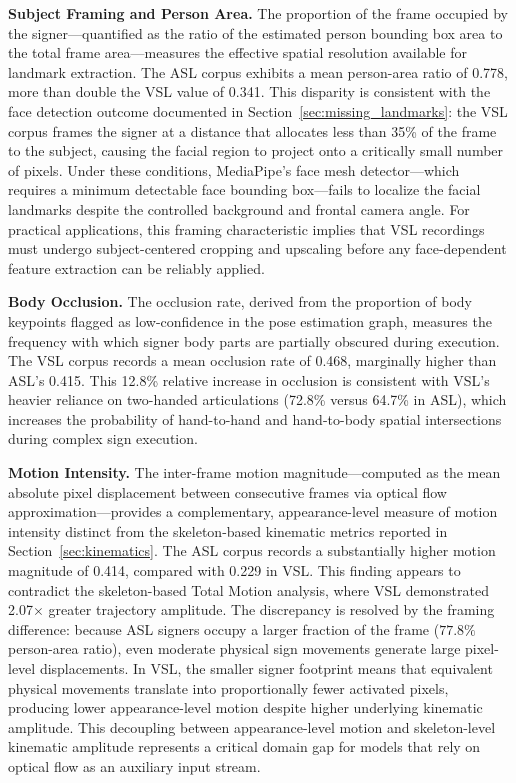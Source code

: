 \documentclass{ieeeaccess}
\DeclareRobustCommand{\textbf}[1]{{\bfseries #1}}
\begin{document}
\textbf{Subject Framing and Person Area.} The proportion of the frame occupied by the signer—quantified as the ratio of the estimated person bounding box area to the total frame area—measures the effective spatial resolution available for landmark extraction. The ASL corpus exhibits a mean person-area ratio of 0.778, more than double the VSL value of 0.341. This disparity is consistent with the face detection outcome documented in Section~\ref{sec:missing_landmarks}: the VSL corpus frames the signer at a distance that allocates less than 35\% of the frame to the subject, causing the facial region to project onto a critically small number of pixels. Under these conditions, MediaPipe's face mesh detector—which requires a minimum detectable face bounding box—fails to localize the facial landmarks despite the controlled background and frontal camera angle. For practical applications, this framing characteristic implies that VSL recordings must undergo subject-centered cropping and upscaling before any face-dependent feature extraction can be reliably applied.

\textbf{Body Occlusion.} The occlusion rate, derived from the proportion of body keypoints flagged as low-confidence in the pose estimation graph, measures the frequency with which signer body parts are partially obscured during execution. The VSL corpus records a mean occlusion rate of 0.468, marginally higher than ASL's 0.415. This 12.8\% relative increase in occlusion is consistent with VSL's heavier reliance on two-handed articulations (72.8\% versus 64.7\% in ASL), which increases the probability of hand-to-hand and hand-to-body spatial intersections during complex sign execution.

\textbf{Motion Intensity.} The inter-frame motion magnitude—computed as the mean absolute pixel displacement between consecutive frames via optical flow approximation—provides a complementary, appearance-level measure of motion intensity distinct from the skeleton-based kinematic metrics reported in Section~\ref{sec:kinematics}. The ASL corpus records a substantially higher motion magnitude of 0.414, compared with 0.229 in VSL. This finding appears to contradict the skeleton-based Total Motion analysis, where VSL demonstrated 2.07$\times$ greater trajectory amplitude. The discrepancy is resolved by the framing difference: because ASL signers occupy a larger fraction of the frame ($77.8\%$ person-area ratio), even moderate physical sign movements generate large pixel-level displacements. In VSL, the smaller signer footprint means that equivalent physical movements translate into proportionally fewer activated pixels, producing lower appearance-level motion despite higher underlying kinematic amplitude. This decoupling between appearance-level motion and skeleton-level kinematic amplitude represents a critical domain gap for models that rely on optical flow as an auxiliary input stream.
\end{document}
